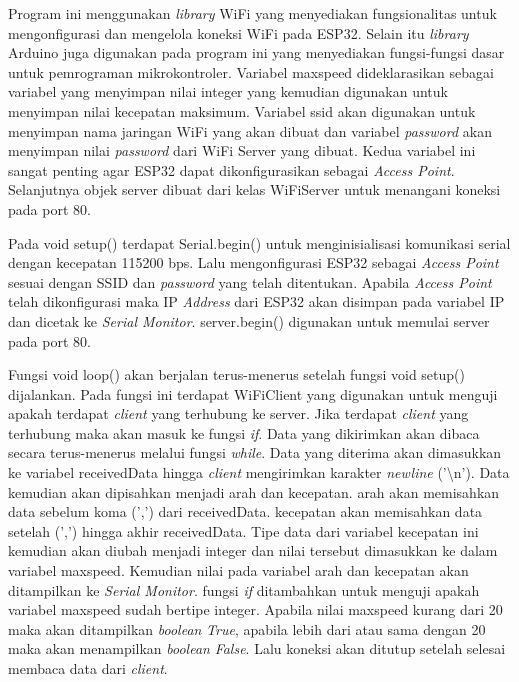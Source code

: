 Program ini menggunakan \emph{library} WiFi yang menyediakan fungsionalitas untuk mengonfigurasi dan mengelola koneksi WiFi pada ESP32. Selain itu \emph{library} Arduino juga digunakan pada program ini yang menyediakan fungsi-fungsi dasar untuk pemrograman mikrokontroler. Variabel maxspeed dideklarasikan sebagai variabel yang menyimpan nilai integer yang kemudian digunakan untuk menyimpan nilai kecepatan maksimum. Variabel ssid akan digunakan untuk menyimpan nama jaringan WiFi yang akan dibuat dan variabel \emph{password} akan menyimpan nilai \emph{password} dari WiFi Server yang dibuat. Kedua variabel ini sangat penting agar ESP32 dapat dikonfigurasikan sebagai \emph{Access Point}. Selanjutnya objek server dibuat dari kelas WiFiServer untuk menangani koneksi pada port 80.

Pada void setup() terdapat Serial.begin() untuk menginisialisasi komunikasi serial dengan kecepatan 115200 bps. Lalu mengonfigurasi ESP32 sebagai \emph{Access Point} sesuai dengan SSID dan \emph{password} yang telah ditentukan. Apabila \emph{Access Point} telah dikonfigurasi maka IP \emph{Address} dari ESP32 akan disimpan pada variabel IP dan dicetak ke \emph{Serial Monitor}. server.begin() digunakan untuk memulai server pada port 80.

Fungsi void loop() akan berjalan terus-menerus setelah fungsi void setup() dijalankan. Pada fungsi ini terdapat WiFiClient yang digunakan untuk menguji apakah terdapat \emph{client} yang terhubung ke server. Jika terdapat \emph{client} yang terhubung maka akan masuk ke fungsi \emph{if}. Data yang dikirimkan akan dibaca secara terus-menerus melalui fungsi \emph{while}. Data yang diterima akan dimasukkan ke variabel receivedData hingga \emph{client} mengirimkan karakter \emph{newline} ('\textbackslash n'). Data kemudian akan dipisahkan menjadi arah dan kecepatan. arah akan memisahkan data sebelum koma (',') dari receivedData. kecepatan akan memisahkan data setelah (',') hingga akhir receivedData. Tipe data dari variabel kecepatan ini kemudian akan diubah menjadi integer dan nilai tersebut dimasukkan ke dalam variabel maxspeed. Kemudian nilai pada variabel arah dan kecepatan akan ditampilkan ke \emph{Serial Monitor}. fungsi \emph{if} ditambahkan untuk menguji apakah variabel maxspeed sudah bertipe integer. Apabila nilai maxspeed kurang dari 20 maka akan ditampilkan \emph{boolean} \emph{True}, apabila lebih dari atau sama dengan 20 maka akan menampilkan \emph{boolean} \emph{False}. Lalu koneksi akan ditutup setelah selesai membaca data dari \emph{client}.

